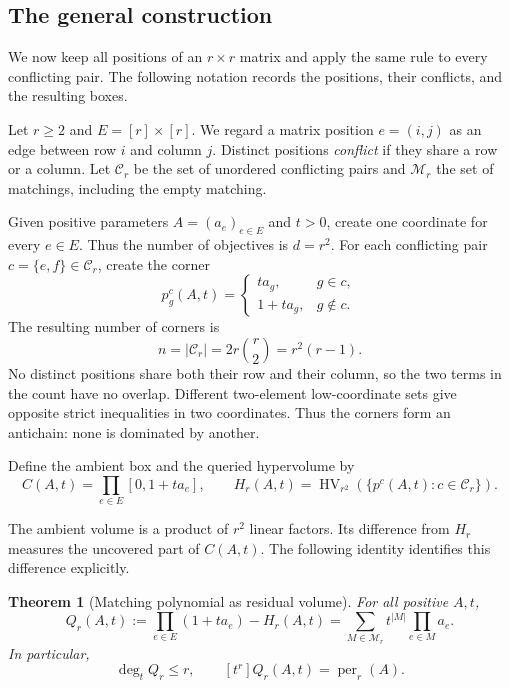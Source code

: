 \documentclass[12pt,a4paper]{article}
\newtheorem{theorem}{Theorem}[section]
\theoremstyle{definition}
\theoremstyle{remark}
\newcommand{\HV}{\operatorname{HV}}
\newcommand{\per}{\operatorname{per}}
\newcommand{\conf}{\mathcal C_r}
\newcommand{\matchings}{\mathcal M_r}
\begin{document}
\subsection{The general construction}

We now keep all positions of an $r\times r$ matrix and apply the same
rule to every conflicting pair. The following notation records the
positions, their conflicts, and the resulting boxes.

Let $r\ge2$ and $E=[r]\times[r]$. We regard a matrix position
$e=(i,j)$ as an edge between row $i$ and column $j$. Distinct positions
\emph{conflict} if they share a row or a column. Let $\conf$ be the set
of unordered conflicting pairs and $\matchings$ the set of matchings,
including the empty matching.

Given positive parameters $A=(a_e)_{e\in E}$ and $t>0$, create one
coordinate for every $e\in E$. Thus the number of objectives is
$d=r^2$. For each conflicting pair $c=\{e,f\}\in\conf$, create the
corner
\begin{equation}
 p^c_g(A,t)=
 \begin{cases}
  ta_g,&g\in c,\\
  1+ta_g,&g\notin c.
 \end{cases}
 \label{eq:corners}
\end{equation}
The resulting number of corners is
\begin{equation}
 n=|\conf|=2r\binom r2=r^2(r-1).
 \label{eq:counts}
\end{equation}
No distinct positions share both their row and their column, so the two
terms in the count have no overlap. Different two-element low-coordinate
sets give opposite strict inequalities in two coordinates. Thus the
corners form an antichain: none is dominated by another.

Define the ambient box and the queried hypervolume by
\[
 C(A,t)=\prod_{e\in E}[0,1+ta_e],\qquad
 H_r(A,t)=\HV_{r^2}(\{p^c(A,t):c\in\conf\}).
\]

The ambient volume is a product of $r^2$ linear factors. Its difference
from $H_r$ measures the uncovered part of $C(A,t)$. The following
identity identifies this difference explicitly.

\begin{theorem}[Matching polynomial as residual volume]
\label{thm:matching}
For all positive $A,t$,
\begin{equation}
 \boxed{\quad
 Q_r(A,t):=\prod_{e\in E}(1+ta_e)-H_r(A,t)
   =\sum_{M\in\matchings}t^{|M|}\prod_{e\in M}a_e.
 \quad}
 \label{eq:matching}
\end{equation}
In particular,
\begin{equation}
 \deg_t Q_r\le r,\qquad [t^r]Q_r(A,t)=\per_r(A).
 \label{eq:coefficient}
\end{equation}
\end{theorem}
\end{document}
